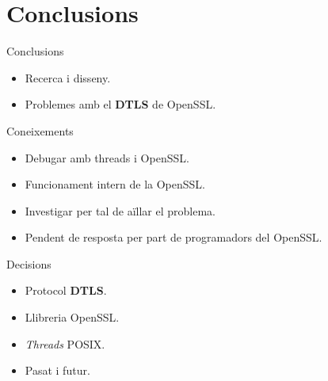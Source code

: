 \section{Conclusions}
    \begin{frame}{Conclusions}
        \begin{itemize}
\item Recerca i disseny.
\item Problemes amb el \textbf{DTLS} de OpenSSL.
        \end{itemize}
        \begin{block}{Coneixements}
        \begin{itemize}
\item Debugar amb threads i OpenSSL.
\item Funcionament intern de la OpenSSL.
\item Investigar per tal de aïllar el problema.
\item Pendent de resposta per part de programadors del OpenSSL.
        \end{itemize}
        \end{block}
        \begin{exampleblock}{Decisions}
        \begin{itemize}
\item Protocol \textbf{DTLS}.
\item Llibreria OpenSSL.
\item \emph{Threads} POSIX.
        \end{itemize}
        \end{exampleblock}
        \begin{itemize}
\item Pasat i futur.
        \end{itemize}
    \end{frame}
